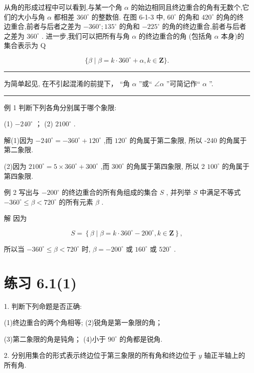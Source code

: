 \documentclass[10pt]{article}
\newcommand{\HRule}{\begin{center}\rule{0.9\linewidth}{0.2mm}\end{center}}
\begin{document}
从角的形成过程中可以看到,与某一个角 \(\alpha\) 的始边相同且终边重合的角有无数个,它们的大小与角 \(\alpha\) 都相差 \({360}^{ \circ  }\) 的整数倍. 在图 6-1-3 中, \({60}^{ \circ  }\) 的角和 \({420}^{ \circ  }\) 的角的终边重合,前者与后者之差为 \(- {360}^{ \circ  };{135}^{ \circ  }\) 的角和 \(- {225}^{ \circ  }\) 的角的终边重合,前者与后者之差为 \({360}^{ \circ  }\) . 进一步,我们可以把所有与角 \(\alpha\) 的终边重合的角 (包括角 \(\alpha\) 本身)的集合表示为 Q

\[
\{ \beta  \mid  \beta  = k \cdot  {360}^{ \circ  } + \alpha ,k \in  \mathbf{Z}\} .
\]

\HRule

为简单起见, 在不引起混淆的前提下， “角 \(\alpha\) ”或“ \(\angle \alpha\) ”可简记作“ \(\alpha\) ”.

\HRule

例 1 判断下列各角分别属于哪个象限:

(1) \(- {240}^{ \circ  }\) ； (2) \({2100}^{ \circ  }\) .

解(1)因为 \(- {240}^{ \circ  } =  - {360}^{ \circ  } + {120}^{ \circ  }\) ,而 \({120}^{ \circ  }\) 的角属于第二象限, 所以 -240 \textdegree  的角属于第二象限.

(2)因为 \(2{100}^{ \circ  } = 5 \times  {360}^{ \circ  } + {300}^{ \circ  }\) ,而 \({300}^{ \circ  }\) 的角属于第四象限, 所以 2 \({100}^{ \circ  }\) 的角属于第四象限.

例 2 写出与 \(- {200}^{ \circ  }\) 的终边重合的所有角组成的集合 \(S\) , 并列举 \(S\) 中满足不等式 \(- {360}^{ \circ  } \leq  \beta  < {720}^{ \circ  }\) 的所有元素 \(\beta\) .

解 因为

\[
S = \left\{  {\beta  \mid  \beta  = k \cdot  {360}^{ \circ  } - {200}^{ \circ  },k \in  \mathbf{Z}}\right\}  ,
\]

所以当 \(- {360}^{ \circ  } \leq  \beta  < {720}^{ \circ  }\) 时, \(\beta  =  - {200}^{ \circ  }\) 或 \({160}^{ \circ  }\) 或 \({520}^{ \circ  }\) .

\section*{练习 6.1(1)}

1. 判断下列命题是否正确:

(1)终边重合的两个角相等; (2)锐角是第一象限的角；

(3)第二象限的角是钝角； (4)小于 \({90}^{ \circ  }\) 的角都是锐角.

2. 分别用集合的形式表示终边位于第三象限的所有角和终边位于 \(y\) 轴正半轴上的所有角.
\end{document}
